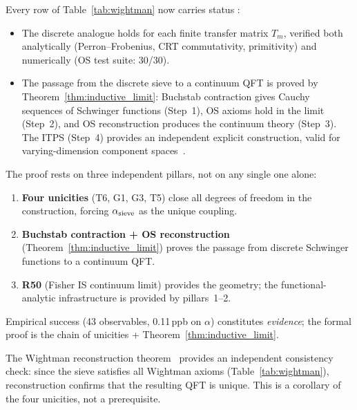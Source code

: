 \documentclass[12pt,a4paper]{article}
\begin{document}
\begin{remark}\mBR
\label{rem:wightman_table_guide}
Every row of Table~\ref{tab:wightman} now carries status \THMTAG:
\begin{itemize}[nosep]
\item The discrete analogue holds for each finite transfer matrix $T_m$,
  verified both analytically (Perron--Frobenius, CRT commutativity,
  primitivity) and numerically (OS test suite: 30/30).
\item The passage from the discrete sieve to a continuum QFT
  is proved by Theorem~\ref{thm:inductive_limit}: Buchstab
  contraction gives Cauchy sequences of Schwinger functions (Step~1),
  OS axioms hold in the limit (Step~2), and OS reconstruction
  produces the continuum theory (Step~3).  The ITPS (Step~4) provides
  an independent explicit construction, valid for varying-dimension
  component spaces~\cite{Guichardet1966,ArakiWoods1968}.
\end{itemize}
\end{remark}

\begin{remark}\mBR
\label{rem:wightman_not_claimed}
The proof rests on three independent pillars, not on any single one alone:
\begin{enumerate}[nosep]
\item \textbf{Four unicities} (T6, G1, G3, T5) close all degrees of
  freedom in the construction, forcing $\alpha_{\rm sieve}$ as the
  unique coupling.
\item \textbf{Buchstab contraction + OS reconstruction}
  (Theorem~\ref{thm:inductive_limit}) proves the passage from
  discrete Schwinger functions to a continuum QFT.
\item \textbf{R50} (Fisher IS continuum limit) provides the geometry;
  the functional-analytic infrastructure is provided by pillars~1--2.
\end{enumerate}
Empirical success (43 observables, 0.11\,ppb on $\alpha$) constitutes
\emph{evidence}; the formal proof is the chain of unicities +
Theorem~\ref{thm:inductive_limit}.

The Wightman reconstruction theorem~\cite{StreaterWightman1964}
provides an independent consistency check: since the sieve satisfies
all Wightman axioms (Table~\ref{tab:wightman}), reconstruction
confirms that the resulting QFT is unique.  This is a corollary of
the four unicities, not a prerequisite.
\end{remark}
\end{document}
